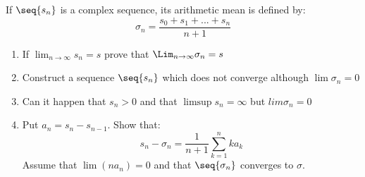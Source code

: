 \documentclass[12pt, letterpaper]{paper}
\begin{document}
\begin{question}
  If $\seq{s_n}$ is a complex sequence, its arithmetic mean is defined
  by:
  \begin{equation*}
    \sigma_n = \frac{s_0 + s_1 + ... + s_n}{n+1}
  \end{equation*}
  \begin{enumerate}
  \item If $\lim_{n\to\infty}s_n = s$ prove that
    $\Lim_{n\to\infty} \sigma_n = s$
  \item Construct a sequence $\seq{s_n}$ which does not converge
    although $\lim \sigma_n = 0$
  \item Can it happen that $s_n > 0$ and that $\limsup s_n = \infty$
    but $lim \sigma_n = 0$
  \item Put $a_n = s_n - s_{n-1}$. Show that:
    \begin{equation*}
      s_n - \sigma_n = \frac{1}{n+1} \sum_{k=1}^n k a_k
    \end{equation*}
    Assume that $\lim (n a_n) = 0$ and that $\seq{\sigma_n}$ converges
    to $\sigma$.
  \end{enumerate}
\end{question}
\end{document}
